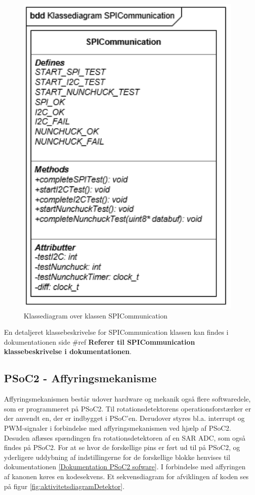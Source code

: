 \begin{figure}[H]
	\centering
	\includegraphics[]{DesignOgImplementering/images/SPICommunication}
	\caption{Klassediagram over klassen SPICommunication}
	\label{figure:KlassediagramSPICommunication}
\end{figure}

En detaljeret klassebeskrivelse for SPICommunication klassen kan findes i dokumentationen side \#ref \textbf{Referer til SPICommunication klassebeskrivelse i dokumentationen}.

\subsection{PSoC2 - Affyringsmekanisme}
 
Affyringsmekanismen består udover hardware og mekanik også flere softwaredele, som er programmeret på PSoC2. Til rotationsdetektorens operationsforstærker er der anvendt en, der er indbygget i PSoC'en. Derudover styres bl.a. interrupt og PWM-signaler i forbindelse med affyringsmekanismen ved hjælp af PSoC2. Desuden aflæses spændingen fra rotationsdetektoren af en SAR ADC, som også findes på PSoC2. For at se hvor de forskellige pins er ført ud til på PSoC2, og yderligere uddybning af indstillingerne for de forskellige blokke henvises til dokumentationen \ref{Dokumentation PSoC2 sofware}. I forbindelse med affyringen af kanonen køres en kodesekvens. Et sekvensdiagram for afviklingen af koden ses på figur \ref{fig:aktivitetsdiagramDetektor}. 
 
